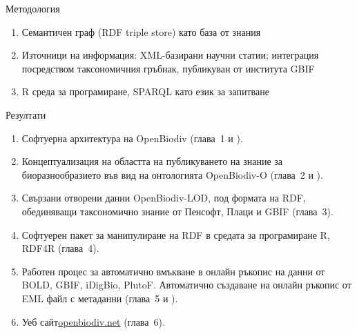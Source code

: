\documentclass[bulgarian]{beamer}
\begin{document}
\begin{frame}{Методология}

\begin{enumerate}
\item {Семантичен граф (RDF triple store) като база от знания}
\item{Източници на информация: XML-базирани научни статии; интеграция посредством таксономичния гръбнак, публикуван от института GBIF}
\item{R среда за програмиране, SPARQL като език за запитване}

\end{enumerate}

\end{frame}

\begin{frame}{Резултати}

\begin{enumerate}
    \item Софтуерна архитектура на OpenBiodiv (глава~1 и \cite{senderov_open_2016}).
    \item Концептуализация на областта на публикуването на знание за биоразнообразието във вид на онтологията OpenBiodiv-O (глава~2 и \cite{senderov_openbiodiv-o:_2018}). 
    \item Свързани отворени данни OpenBiodiv-LOD, под формата на RDF, обединяващи таксономично знание от Пенсофт, Плаци и GBIF (глава~3).
    \item Софтуерен пакет за манипулиране на RDF в средата за програмиране R, RDF4R (глава~4).
    \item Работен процес за автоматично вмъкване в онлайн ръкопис на данни от BOLD, GBIF, iDigBio, PlutoF. Автоматично създаване на онлайн ръкопис от EML файл с метаданни (глава~5 и \cite{senderov_online_2016}).
    \item Уеб сайт\href{http://openbiodiv.net}{openbiodiv.net} (глава~6).

\end{enumerate}
    
\end{frame}
\end{document}
